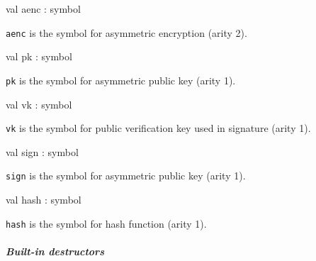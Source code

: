 \label{val:Term.aenc}\begin{ocamldoccode}
val aenc : symbol
\end{ocamldoccode}
\begin{ocamldocdescription}
{\tt{aenc}} is the symbol for asymmetric encryption (arity 2).


\end{ocamldocdescription}




\label{val:Term.pk}\begin{ocamldoccode}
val pk : symbol
\end{ocamldoccode}
\begin{ocamldocdescription}
{\tt{pk}} is the symbol for asymmetric public key (arity 1).


\end{ocamldocdescription}




\label{val:Term.vk}\begin{ocamldoccode}
val vk : symbol
\end{ocamldoccode}
\begin{ocamldocdescription}
{\tt{vk}} is the symbol for public verification key used in signature (arity 1).


\end{ocamldocdescription}




\label{val:Term.sign}\begin{ocamldoccode}
val sign : symbol
\end{ocamldoccode}
\begin{ocamldocdescription}
{\tt{sign}} is the symbol for asymmetric public key (arity 1).


\end{ocamldocdescription}




\label{val:Term.hash}\begin{ocamldoccode}
val hash : symbol
\end{ocamldoccode}
\begin{ocamldocdescription}
{\tt{hash}} is the symbol for hash function (arity 1).


\end{ocamldocdescription}




\subparagraph{Built-in destructors}




